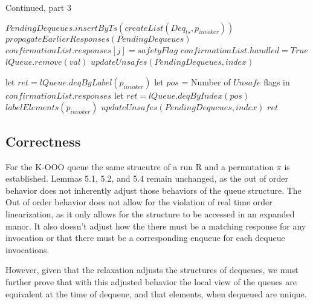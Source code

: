 \documentclass[a4paper,USenglish]{lipics-v2021} %
\begin{document}
\begin{algorithm}
  \caption{Continued, part 3}
  \begin{algorithmic}[1]
        \State $PendingDequeues.insertByTs(createList(Deq_{ts}, p_{invoker}))$
      \EndIf
      \State $propagateEarlierResponses(PendingDequeues)$ 
          \State $confirmationList.responses[j] = safetyFlag$
        \EndIf 
          \State $confirmationList.handled = True$ 
            \State $lQueue.remove(val)$
          \EndIf 
          \State $updateUnsafes(PendingDequeues, index)$
            \State \Return
          \EndIf

          \State let $ret = lQueue.deqByLabel(p_{invoker})$
          \Else 
            \State let $pos$ = Number of $Unsafe$ flags in $confirmationList.responses$
            \State let $ret = lQueue.deqByIndex(pos)$
          \EndIf
          \State $labelElements(p_{invoker})$
          \State $updateUnsafes(PendingDequeues, \textit{index})$
            \State \Return $ret$
          \EndIf
        \EndIf 
      \EndFor
    \EndFunction
  \end{algorithmic}
\end{algorithm}



\subsection{Correctness}
For the K-OOO queue the same strucutre of a run R and a permutation $\pi$ is established. Lemmas 5.1, 5.2, and 5.4 remain unchanged, as the out of order behavior does not inherently adjust those behaviors of the queue structure. The Out of order behavior does not allow for the violation of real time order linearization, as it only allows for the structure to be accessed in an expanded manor. It also doesn't adjust how the there must be a matching response for any invocation or that there must be a corresponding enqueue for each dequeue invocations. 

However, given that the relaxation adjusts the structures of dequeues, we must further prove that with this adjusted behavior the local view of the queues are equivalent at the time of dequeue, and that elements, when dequeued are unique. 
\end{document}
